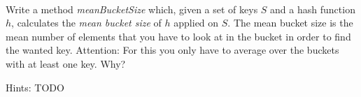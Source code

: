  \\
Write a method \textit{meanBucketSize} which,
given a set of keys $S$ and a hash function $h$,
calculates the \textit{mean bucket size} of $h$ applied on $S$.
The mean bucket size is the mean number of elements that you have to look at
in the bucket in order to find the wanted key.
Attention: For this you only have to average over the buckets with at least
one key.
Why?

Hints: TODO